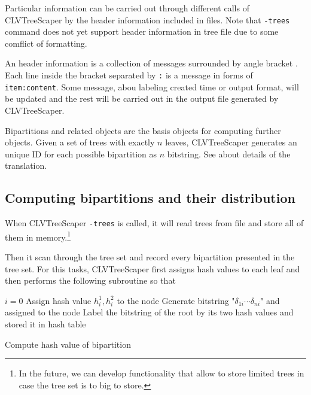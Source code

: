 \documentclass[11pt]{article}
\begin{document}
Particular information can be carried out through different calls of CLVTreeScaper by the header information included in files. Note that {\tt -trees} command does not yet support header information in tree file due to some comflict of formatting.

An header information is a collection of messages surrounded by angle bracket {\tt < >}. Each line inside the bracket separated by {\tt :} is a message in forms of {\tt item:content}. Some message, abou labeling created time or output format, will be updated and the rest will be carried out in the output file generated by CLVTreeScaper.



Bipartitions and related objects are the basis objects for computing further objects. Given a set of trees with exactly $n$ leaves, CLVTreeScaper generates an unique ID for each possible bipartition as $n$ bitstring. See \cite{sul2011big} about details of the translation.

\subsection{Computing bipartitions and their distribution}

When CLVTreeScaper {\tt -trees} is called, it will read trees from file and store all of them in memory.\footnote{In the future, we can develop functionality that allow to store limited trees in case the tree set is to big to store.} 

Then it scan through the tree set and record every bipartition presented in the tree set. For this tasks, CLVTreeScaper first assigns hash values to each leaf and then performs the following subroutine so that 

\begin{algorithm}[H]
    \DontPrintSemicolon
    $i=0$ \;
    { 
		{
			Assign hash value $h_i^1,h_i^2$ to the node\;
			Generate bitstring "$\delta_{1i}\cdots\delta_{ni}$" and assigned to the node\;
		}
	}
	Label the bitstring of the root by its two hash values and stored it in hash table\;
    \caption{Compute hash value of bipartition}
    \label{alg:computehash}
\end{algorithm}
\end{document}
